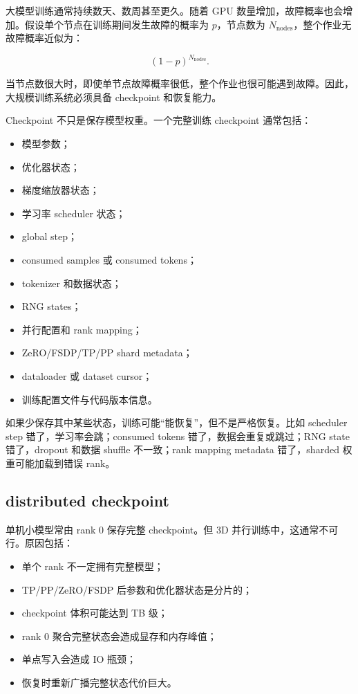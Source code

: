 大模型训练通常持续数天、数周甚至更久。随着 GPU 数量增加，故障概率也会增加。假设单个节点在训练期间发生故障的概率为 $p$，节点数为 $N_{\mathrm{nodes}}$，整个作业无故障概率近似为：

\[
(1-p)^{N_{\mathrm{nodes}}}.
\]

当节点数很大时，即使单节点故障概率很低，整个作业也很可能遇到故障。因此，大规模训练系统必须具备 checkpoint 和恢复能力。

Checkpoint 不只是保存模型权重。一个完整训练 checkpoint 通常包括：

\begin{itemize}
\item 模型参数；
\item 优化器状态；
\item 梯度缩放器状态；
\item 学习率 scheduler 状态；
\item global step；
\item consumed samples 或 consumed tokens；
\item tokenizer 和数据状态；
\item RNG states；
\item 并行配置和 rank mapping；
\item ZeRO/FSDP/TP/PP shard metadata；
\item dataloader 或 dataset cursor；
\item 训练配置文件与代码版本信息。
\end{itemize}

如果少保存其中某些状态，训练可能“能恢复”，但不是严格恢复。比如 scheduler step 错了，学习率会跳；consumed tokens 错了，数据会重复或跳过；RNG state 错了，dropout 和数据 shuffle 不一致；rank mapping metadata 错了，sharded 权重可能加载到错误 rank。

\subsection{distributed checkpoint}
\label{subsec:distributed-checkpoint}

单机小模型常由 rank 0 保存完整 checkpoint。但 3D 并行训练中，这通常不可行。原因包括：

\begin{itemize}
\item 单个 rank 不一定拥有完整模型；
\item TP/PP/ZeRO/FSDP 后参数和优化器状态是分片的；
\item checkpoint 体积可能达到 TB 级；
\item rank 0 聚合完整状态会造成显存和内存峰值；
\item 单点写入会造成 IO 瓶颈；
\item 恢复时重新广播完整状态代价巨大。
\end{itemize}

